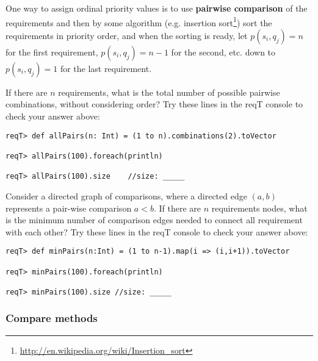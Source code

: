 \documentclass[11pt]{article}
\begin{document}
One way to assign ordinal priority values is to use {\bf pairwise comparison} of the requirements and then by some algorithm (e.g. insertion sort\footnote{\url{http://en.wikipedia.org/wiki/Insertion_sort}}) sort the requirements in priority order, and when the sorting is ready, let $p(s_i, q_j) = n$ for the first requirement,  $p(s_i, q_j) = n - 1$ for the second, etc. down to $p(s_i, q_j) = 1$ for the last requirement. 


\begin{framed}
\noindent 
If there are $n$ requirements, what is the total number of possible pairwise combinations, without considering order? 
\newline\newline   \underline{\hspace{11cm}}
\newline\newline Try these lines in the reqT console to check your answer above:

{\scriptsize\begin{verbatim}
reqT> def allPairs(n: Int) = (1 to n).combinations(2).toVector

reqT> allPairs(100).foreach(println)    

reqT> allPairs(100).size    //size: _____ 
\end{verbatim}}

\noindent
Consider a directed graph of comparisons, where a directed edge $(a,b)$ represents a pair-wise comparison $a < b$. If there are $n$ requirements nodes, what is the minimum number of comparison edges needed to connect all requirement with each other? 
\newline\newline   \underline{\hspace{11cm}}
\newline\newline Try these lines in the reqT console to check your answer above:

{\scriptsize\begin{verbatim}
reqT> def minPairs(n:Int) = (1 to n-1).map(i => (i,i+1)).toVector        

reqT> minPairs(100).foreach(println)    

reqT> minPairs(100).size //size: _____ 
\end{verbatim}}
 \end{framed}
 
 \subsubsection{Compare methods}\label{section:priocmpr}
  
\end{document}

